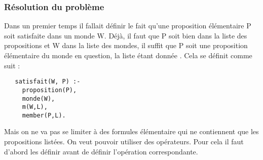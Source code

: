 \documentclass[a4paper,10pt]{article}
\begin{document}
   \subsubsection{R\'{e}solution du probl\`{e}me}
   Dans un premier temps il fallait d\'{e}finir le fait qu'une proposition \'{e}l\'{e}mentaire P soit satisfaite dans un monde W. D\'{e}j\`{a}, il faut que P soit bien dans 
   la liste des propositions et W dans la liste des mondes, il suffit que P soit une proposition \'{e}l\'{e}mentaire du monde en question,
   la liste \'{e}tant donn\'{e}e . Cela se d\'{e}finit comme suit :
   \begin{lstlisting}
   satisfait(W, P) :-
     proposition(P),
     monde(W),
     m(W,L),
     member(P,L).
   \end{lstlisting}
   Mais on ne va pas se limiter \`{a} des formules \'{e}l\'{e}mentaire qui ne contiennent que les propositions list\'{e}es. On veut pouvoir utiliser des op\'{e}rateurs.
   Pour cela il faut d'abord les d\'{e}finir avant de d\'{e}finir l'op\'{e}ration correspondante.
\end{document}

